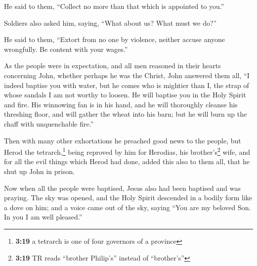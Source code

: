  He said to them, ``Collect no more than that which is
appointed to you.''

 Soldiers also asked him, saying, ``What about us? What
must we do?''

He said to them, ``Extort from no one by violence, neither accuse anyone
wrongfully. Be content with your wages.''

 As the people were in expectation, and all men reasoned
in their hearts concerning John, whether perhaps he was the Christ,
 John answered them all, ``I indeed baptise you with
water, but he comes who is mightier than I, the strap of whose sandals I
am not worthy to loosen. He will baptise you in the Holy Spirit and
fire.  His winnowing fan is in his hand, and he will
thoroughly cleanse his threshing floor, and will gather the wheat into
his barn; but he will burn up the chaff with unquenchable fire.''

 Then with many other exhortations he preached good news
to the people,  but Herod the tetrarch,\footnote{\textbf{3:19}
  a tetrarch is one of four governors of a province} being reproved by
him for Herodias, his brother's\footnote{\textbf{3:19} TR reads
  ``brother Philip's'' instead of ``brother's''} wife, and for all the
evil things which Herod had done,  added this also to
them all, that he shut up John in prison.

 Now when all the people were baptised, Jesus also had
been baptised and was praying. The sky was opened,  and
the Holy Spirit descended in a bodily form like a dove on him; and a
voice came out of the sky, saying ``You are my beloved Son. In you I am
well pleased.''

